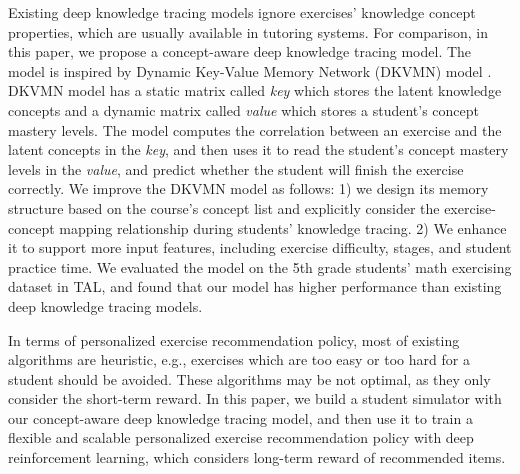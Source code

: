 \documentclass{edm_template}
\begin{document}
Existing deep knowledge tracing models \cite{dkt,dkvmn} ignore exercises' knowledge concept properties, which are usually available in tutoring systems. For comparison,
in this paper, we propose a concept-aware deep knowledge tracing model. The model is inspired by Dynamic Key-Value Memory Network (DKVMN) model \cite{dkvmn}. DKVMN model has a static matrix called \textit{key} which stores the latent knowledge concepts and a dynamic matrix called \textit{value} which stores a student's concept mastery levels. The model computes the correlation between an exercise and the latent concepts in the \textit{key}, and then uses it to read the student's concept mastery levels in the \textit{value}, and predict whether the student will finish the exercise correctly. 
We improve the DKVMN model as follows: 1) we design its memory structure based on the course's concept list and explicitly consider the exercise-concept mapping relationship during students' knowledge tracing. 2) We enhance it to support more input features, including exercise difficulty, stages, and student practice time. We evaluated the model on the 5th grade students' math exercising dataset in TAL, and found that our model has higher performance than existing deep knowledge tracing models.

In terms of personalized exercise recommendation policy, most of existing algorithms are heuristic, e.g., exercises which are too easy or too hard for a student should be avoided. These algorithms may be not optimal, as they only consider the short-term reward.
In this paper, we build a student simulator with our concept-aware deep knowledge tracing model, and then use it to train a flexible and scalable personalized exercise recommendation policy with deep reinforcement learning, which considers long-term reward of recommended items.
\end{document}
